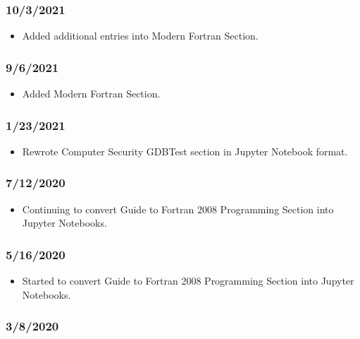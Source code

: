 \subsubsection{10/3/2021}

\begin{itemize}
\item Added additional entries into Modern Fortran Section.
\end{itemize}

\subsubsection{9/6/2021}

\begin{itemize}
\item Added Modern Fortran Section.
\end{itemize}

\subsubsection{1/23/2021}

\begin{itemize}
\item Rewrote Computer Security GDBTest section in Jupyter Notebook format.
\end{itemize}

\subsubsection{7/12/2020}

\begin{itemize}
\item Continuing to convert Guide to Fortran 2008 Programming Section into Jupyter Notebooks.
\end{itemize}

\subsubsection{5/16/2020}

\begin{itemize}
\item Started to convert Guide to Fortran 2008 Programming Section into Jupyter Notebooks.
\end{itemize}

\subsubsection{3/8/2020}

